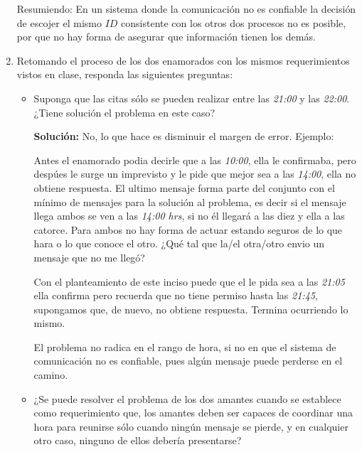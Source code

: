\documentclass[8pt, letterpaper]{article}
\begin{document}
\begin{enumerate}
  Resumiendo: En un sistema donde la comunicación no es confiable la decisión
  de escojer el mismo $ID$ consistente con los otros dos procesos no es
  posible, por que no hay forma de asegurar que información tienen los demás.
  \rmfamily
  \newpage
\item  Retomando el proceso de los dos enamorados con los mismos requerimientos
  vistos en clase, responda las siguientes preguntas:
  \begin{itemize}
  \item Suponga que las citas sólo se pueden realizar entre las \textit{21:00}
    y las \textit{22:00}. ¿Tiene solución el problema en este caso?
    
    \hfill\break
    {\bf Solución:}\hfill\break
    No, lo que hace es disminuir el margen de error. Ejemplo:

    Antes el enamorado podia decirle que a las \textit{10:00}, ella le
    confirmaba, pero despúes le surge un imprevisto y le pide que mejor sea a
    las \textit{14:00}, ella no obtiene respuesta. El ultimo mensaje forma
    parte del conjunto con el mínimo de mensajes para la solución al problema,
    es decir si el mensaje llega ambos se ven a las \textit{14:00 hrs},
    si no él llegará a las diez y ella a las catorce. Para ambos no hay forma
    de actuar estando seguros de lo que hara o lo que conoce el otro.
    ¿Qué tal que la/el otra/otro envio un mensaje que no me llegó?

    Con el planteamiento de este inciso puede que el le pida sea a las
    \textit{21:05} ella confirma pero recuerda que no tiene permiso hasta
    las \textit{21:45}, supongamos que, de nuevo, no obtiene respuesta.
    Termina ocurriendo lo mismo.

    El problema no radica en el rango de hora, si no en que el sistema de
    comunicación no es confiable, pues algún mensaje puede perderse en
    el camino.
    \hfill\break
  \item ¿Se puede resolver el problema de los dos amantes cuando se establece
    como requerimiento que, los amantes deben ser capaces de coordinar una
    hora para reunirse sólo cuando ningún mensaje se pierde, y en cualquier
    otro caso, ninguno de ellos debería presentarse?
    

\end{itemize}
\end{enumerate}
\end{document}
